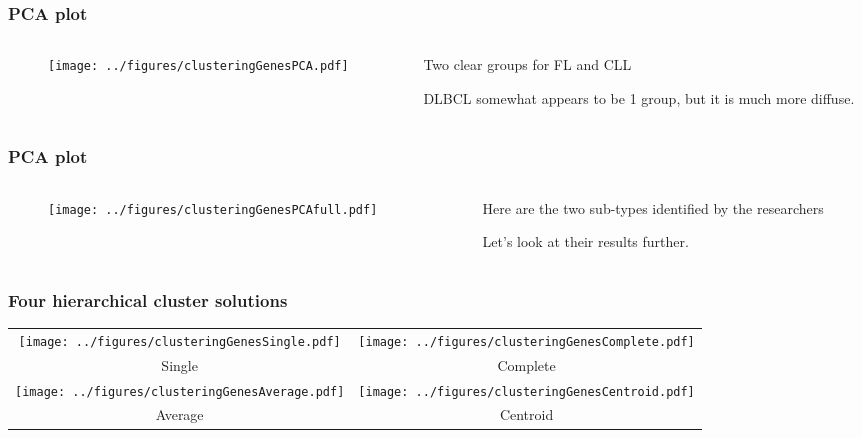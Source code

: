 \documentclass{beamer}
\begin{document}
\begin{frame}[fragile]
\frametitle{PCA plot}
\begin{columns}[T]
\begin{column}{.65\textwidth}
\begin{figure}
\centering
  \texttt{[image: ../figures/clusteringGenesPCA.pdf]} 
\end{figure}
\end{column}
\begin{column}{.35\textwidth} 
\vsp
\vsp
\vsp

Two clear groups for FL and CLL

\vsp
DLBCL somewhat appears to be 1 group, but it is much more diffuse.
\end{column}
\end{columns}


\end{frame}

\begin{frame}[fragile]
\frametitle{PCA plot}
\begin{columns}[T]
\begin{column}{.65\textwidth}
\begin{figure}
\centering
  \texttt{[image: ../figures/clusteringGenesPCAfull.pdf]} 
\end{figure}
\end{column}
\begin{column}{.35\textwidth} 
\vsp
\vsp
\vsp

Here are the two sub-types identified by the researchers

\vsp
Let's look at their results further.
\end{column}
\end{columns}
\end{frame}

\begin{frame}[fragile]
\frametitle{Four hierarchical cluster solutions}
\scriptsize
\begin{table}
\begin{tabular}{cc}
  \texttt{[image: ../figures/clusteringGenesSingle.pdf]}  &
    \texttt{[image: ../figures/clusteringGenesComplete.pdf]}  \\
    Single & Complete \\
  \texttt{[image: ../figures/clusteringGenesAverage.pdf]}  &
    \texttt{[image: ../figures/clusteringGenesCentroid.pdf]}  \\
  Average & Centroid 
\end{tabular}
\end{table}
\end{frame}
\end{document}
